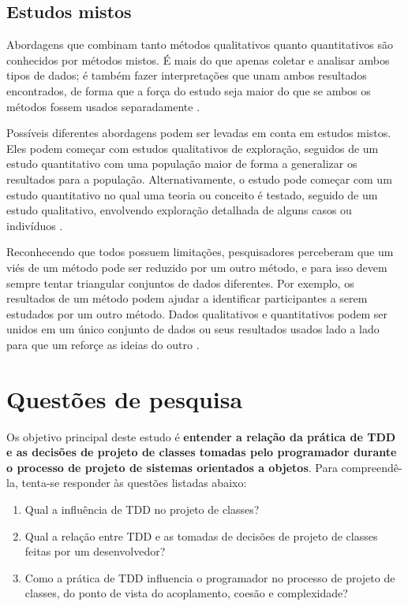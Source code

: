 \subsection{Estudos mistos}

Abordagens que combinam tanto métodos qualitativos quanto quantitativos são conhecidos por métodos mistos. 
É mais do que apenas coletar e analisar ambos tipos de dados; é também fazer interpretações que unam ambos
resultados encontrados, de forma que a força do estudo seja maior do que se ambos os métodos fossem
usados separadamente \cite{creswell}.

Possíveis diferentes abordagens podem ser levadas em conta em estudos mistos. Eles podem começar com estudos
qualitativos de exploração, seguidos de um estudo quantitativo com uma população maior de forma a
generalizar os resultados para a população. Alternativamente, o estudo pode começar com um estudo quantitativo
no qual uma teoria ou conceito é testado, seguido de um estudo qualitativo, envolvendo exploração detalhada
de alguns casos ou indivíduos \cite{creswell}.

Reconhecendo que todos possuem limitações, pesquisadores perceberam que um viés de um método pode ser reduzido
por um outro método, e para isso devem sempre tentar triangular conjuntos de dados diferentes.
Por exemplo, os resultados de um método podem ajudar a identificar participantes a serem estudados por um outro método.
Dados qualitativos e quantitativos podem ser unidos em um único conjunto de dados ou seus resultados usados
lado a lado para que um reforçe as ideias do outro \cite{creswell}.

\section{Questões de pesquisa}

Os objetivo principal deste estudo é \textbf{entender a relação da prática de TDD 
e as decisões de projeto de classes tomadas pelo programador durante o processo de 
projeto de sistemas orientados a objetos}.
Para compreendê-la, tenta-se responder às questões listadas
abaixo:

\begin{enumerate}

	\item Qual a influência de TDD no projeto de classes?

	\item Qual a relação entre TDD e as tomadas de decisões de projeto de classes
	feitas por um desenvolvedor?

	\item Como a prática de TDD influencia o programador no processo de  
	projeto de classes, do ponto de vista do acoplamento, coesão e complexidade?

\end{enumerate}

